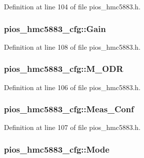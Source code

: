 Definition at line 104 of file pios\-\_\-hmc5883.\-h.

\hypertarget{structpios__hmc5883__cfg_a82fb6708784acace10b4f5c5a9c8e23e}{
\subsubsection[{Gain}]{ pios\-\_\-hmc5883\-\_\-cfg\-::\-Gain}}\label{structpios__hmc5883__cfg_a82fb6708784acace10b4f5c5a9c8e23e}


Definition at line 108 of file pios\-\_\-hmc5883.\-h.

\hypertarget{structpios__hmc5883__cfg_a236d1b5f3c3858bc2edd263841c37ace}{
\subsubsection[{M\-\_\-\-O\-D\-R}]{ pios\-\_\-hmc5883\-\_\-cfg\-::\-M\-\_\-\-O\-D\-R}}\label{structpios__hmc5883__cfg_a236d1b5f3c3858bc2edd263841c37ace}


Definition at line 106 of file pios\-\_\-hmc5883.\-h.

\hypertarget{structpios__hmc5883__cfg_ab04e80aeca39b18767e5e6cbe1f39654}{
\subsubsection[{Meas\-\_\-\-Conf}]{ pios\-\_\-hmc5883\-\_\-cfg\-::\-Meas\-\_\-\-Conf}}\label{structpios__hmc5883__cfg_ab04e80aeca39b18767e5e6cbe1f39654}


Definition at line 107 of file pios\-\_\-hmc5883.\-h.

\hypertarget{structpios__hmc5883__cfg_a0d50b5428ef5db686bdbd44127425f28}{
\subsubsection[{Mode}]{ pios\-\_\-hmc5883\-\_\-cfg\-::\-Mode}}\label{structpios__hmc5883__cfg_a0d50b5428ef5db686bdbd44127425f28}


